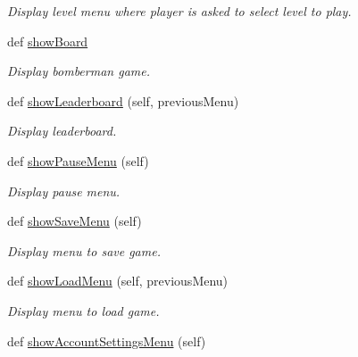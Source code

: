 \begin{DoxyCompactItemize}
\begin{DoxyCompactList}\small\item\em Display level menu where player is asked to select level to play. \end{DoxyCompactList}\item 
def \hyperlink{classsrc_1_1game_1_1_game_a570dba568ad9dd3b9745e0f10a4b29a8}{show\+Board}
\begin{DoxyCompactList}\small\item\em Display bomberman game. \end{DoxyCompactList}\item 
\hypertarget{classsrc_1_1game_1_1_game_a13a6d564b3397c8c520b0b23e99d0880}{}def \hyperlink{classsrc_1_1game_1_1_game_a13a6d564b3397c8c520b0b23e99d0880}{show\+Leaderboard} (self, previous\+Menu)\label{classsrc_1_1game_1_1_game_a13a6d564b3397c8c520b0b23e99d0880}

\begin{DoxyCompactList}\small\item\em Display leaderboard. \end{DoxyCompactList}\item 
\hypertarget{classsrc_1_1game_1_1_game_a0e17658d314189179aa5be0bfdc185da}{}def \hyperlink{classsrc_1_1game_1_1_game_a0e17658d314189179aa5be0bfdc185da}{show\+Pause\+Menu} (self)\label{classsrc_1_1game_1_1_game_a0e17658d314189179aa5be0bfdc185da}

\begin{DoxyCompactList}\small\item\em Display pause menu. \end{DoxyCompactList}\item 
\hypertarget{classsrc_1_1game_1_1_game_a02ee6b88570e0af0686050a2268f687b}{}def \hyperlink{classsrc_1_1game_1_1_game_a02ee6b88570e0af0686050a2268f687b}{show\+Save\+Menu} (self)\label{classsrc_1_1game_1_1_game_a02ee6b88570e0af0686050a2268f687b}

\begin{DoxyCompactList}\small\item\em Display menu to save game. \end{DoxyCompactList}\item 
\hypertarget{classsrc_1_1game_1_1_game_a4c38f9b4c2f4e81a49e25632dccd8622}{}def \hyperlink{classsrc_1_1game_1_1_game_a4c38f9b4c2f4e81a49e25632dccd8622}{show\+Load\+Menu} (self, previous\+Menu)\label{classsrc_1_1game_1_1_game_a4c38f9b4c2f4e81a49e25632dccd8622}

\begin{DoxyCompactList}\small\item\em Display menu to load game. \end{DoxyCompactList}\item 
\hypertarget{classsrc_1_1game_1_1_game_a42b40336207a65cb12910ae7d1a4175d}{}def \hyperlink{classsrc_1_1game_1_1_game_a42b40336207a65cb12910ae7d1a4175d}{show\+Account\+Settings\+Menu} (self)\label{classsrc_1_1game_1_1_game_a42b40336207a65cb12910ae7d1a4175d}


\end{DoxyCompactItemize}
